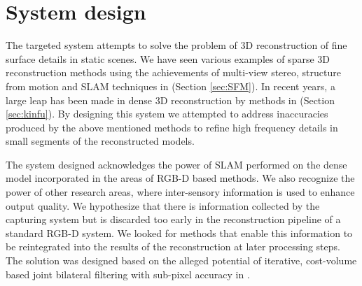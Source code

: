 \documentclass{ucl_thesis}
\newcommand{\secref}[1]{(Section \ref{#1})}
\begin{document}
%					
%					
%		
%		
%	

\chapter{System design} 
\label{chp:my_system}

\par The targeted system attempts to solve the problem of 3D reconstruction of fine surface details in static scenes. We have seen various examples of sparse 3D reconstruction methods using the achievements of multi-view stereo, structure from motion and SLAM techniques in \secref{sec:SFM}. In recent years, a large leap has been made in dense 3D reconstruction by methods in \secref{sec:kinfu}. By designing this system we attempted to address inaccuracies produced by the above mentioned methods to refine high frequency details in small segments of the reconstructed models. \\

\par The system designed acknowledges the power of SLAM performed on the dense model incorporated in the areas of RGB-D based methods. We also recognize the power of other research areas, where inter-sensory information is used to enhance output quality. We hypothesize that there is information collected by the capturing system but is discarded too early in the reconstruction pipeline of a standard RGB-D system. We looked for methods that enable this information to be reintegrated into the results of the reconstruction at later processing steps. The solution was designed based on the alleged potential of iterative, cost-volume based joint bilateral filtering with sub-pixel accuracy in \citep{cvpr-07-qingxiong-yang}. \\
\end{document}
